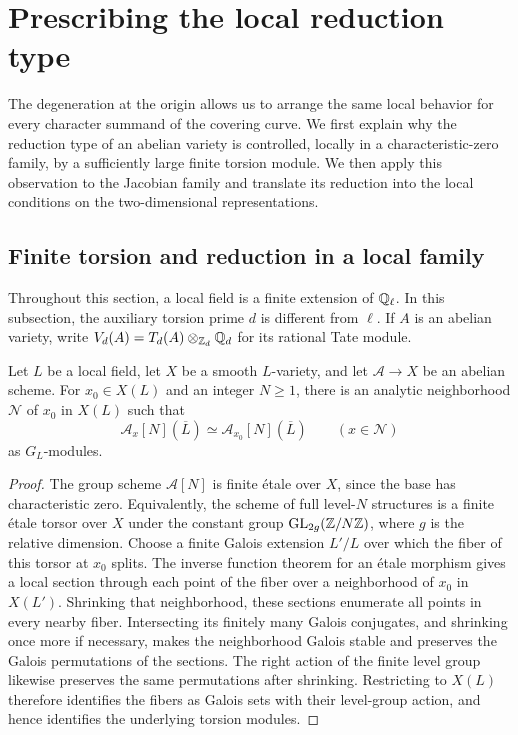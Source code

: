 \section{Prescribing the local reduction type}\label{sec:local}

The degeneration at the origin allows us to arrange the same local behavior
for every character summand of the covering curve.  We first explain why the
reduction type of an abelian variety is controlled, locally in a
characteristic-zero family, by a sufficiently large finite torsion module.
We then apply this observation to the Jacobian family and translate its
reduction into the local conditions on the two-dimensional representations.

\subsection{Finite torsion and reduction in a local family}

Throughout this section, a local field is a finite extension of
$\mathbb Q_\ell$.  In this subsection, the auxiliary torsion prime $d$ is different
from $\ell$.  If $A$ is an abelian variety, write
$V_d(A)=T_d(A)\otimes_{\mathbb Z_d}\mathbb Q_d$ for its rational Tate module.

\begin{lemma}\label{loc:torsion}
Let $L$ be a local field, let $X$ be a smooth $L$-variety, and let
$\mathcal A\to X$ be an abelian scheme.  For $x_0\in X(L)$ and an integer
$N\geq 1$, there is an analytic neighborhood $\mathcal N$ of $x_0$ in
$X(L)$ such that
\[
 \mathcal A_x[N](\overline L)\simeq
 \mathcal A_{x_0}[N](\overline L)
 \qquad (x\in\mathcal N)
\]
as $G_L$-modules.
\end{lemma}

\begin{proof}
The group scheme $\mathcal A[N]$ is finite \'{e}tale over $X$, since the
base has characteristic zero.  Equivalently, the scheme of full level-$N$
structures is a finite \'{e}tale torsor over $X$ under the constant group
$\operatorname{GL}_{2g}(\mathbb Z/N\mathbb Z)$, where $g$ is the relative dimension.
Choose a finite Galois extension $L'/L$ over which the fiber of this torsor
at $x_0$ splits.  The inverse function theorem for an \'{e}tale morphism gives
a local section through each point of the fiber over a neighborhood of
$x_0$ in $X(L')$.  Shrinking that neighborhood, these sections enumerate
all points in every nearby fiber.  Intersecting its finitely many Galois
conjugates, and shrinking once more if necessary, makes the neighborhood
Galois stable and preserves the Galois permutations of the sections.
The right action of the finite level group likewise preserves the same
permutations after shrinking.  Restricting to $X(L)$ therefore identifies
the fibers as Galois sets with their level-group action, and hence
identifies the underlying torsion modules.
\end{proof}


